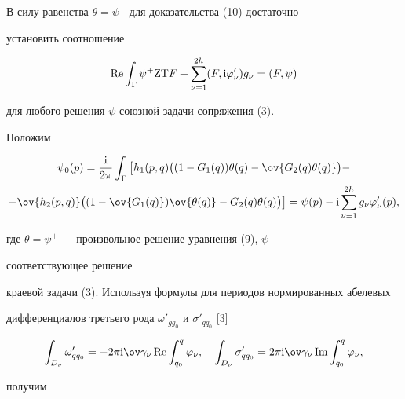  


\begin{pf} 


В силу равенства $\theta=\psi^+$ для доказательства (10) достаточно 


установить соотношение 


\begin{equation} 


\re\int_\Gamma\psi^+{\mathrm Z}{\mathrm T}F+\sum^{2h}_{\nu=1} 


(F,{\mathrm i}\varphi'_\nu)g_\nu=(F,\psi) 


\end{equation} 


для любого решения $\psi$ союзной задачи сопряжения (3). 


 


Положим 


\begin{multline} 


\psi_0(p)=\frac{{\mathrm i}}{2\pi}\int_\Gamma\big[h_1(p,q) 


\big((1-G_1(q))\theta(q)-\ov{G_2(q)\theta(q)}\big) - \\ 


% 


-\ov{h_2(p,q)}\big((1-\ov{G_1(q)})\ov{\theta(q)}- 


G_2(q)\theta(q)\big)\big]=\psi(p)-{\mathrm i} 


\sum^{2h}_{\nu=1}g_\nu\varphi'_\nu(p), 


\end{multline} 


где $\theta=\psi^+$ --- произвольное решение уравнения (9), $\psi$ --- 


соответствующее решение 


краевой задачи (3). Используя формулы для периодов нормированных абелевых 


дифференциалов третьего рода $\omega'_{gg_0}$ и $\sigma'_{qq_0}$ [3] 


$$ 


\int_{D_\nu}\omega'_{qq_0}=-2\pi{\mathrm i}\ov\gamma_\nu\re 


\int^q_{q_0}\varphi_\nu,\quad \int_{D_\nu}\sigma'_{qq_0} 


=2\pi{\mathrm i}\ov\gamma_\nu\im\int^q_{q_0}\varphi_\nu, 


$$ 


получим 


\begin{equation} 



\end{equation}
\end{pf}
